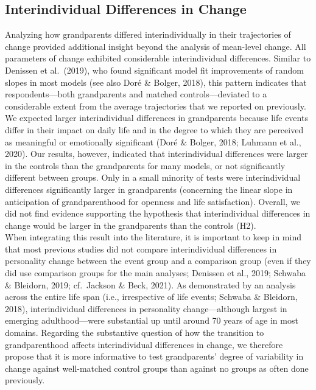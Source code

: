 \documentclass[
  english,
  man,floatsintext]{apa7}
\begin{document}
\hypertarget{interindividual-differences-in-change-1}{%
\subsection{Interindividual Differences in Change}\label{interindividual-differences-in-change-1}}

Analyzing how grandparents differed interindividually in their trajectories of change provided additional insight beyond the analysis of mean-level change. All parameters of change exhibited considerable interindividual differences. Similar to Denissen et al.~(2019), who found significant model fit improvements of random slopes in most models (see also Doré \& Bolger, 2018), this pattern indicates that respondents---both grandparents and matched controls---deviated to a considerable extent from the average trajectories that we reported on previously.\\
We expected larger interindividual differences in grandparents because life events differ in their impact on daily life and in the degree to which they are perceived as meaningful or emotionally significant (Doré \& Bolger, 2018; Luhmann et al., 2020). Our results, however, indicated that interindividual differences were larger in the controls than the grandparents for many models, or not significantly different between groups. Only in a small minority of tests were interindividual differences significantly larger in grandparents (concerning the linear slope in anticipation of grandparenthood for openness and life satisfaction). Overall, we did not find evidence supporting the hypothesis that interindividual differences in change would be larger in the grandparents than the controls (H2).\\
When integrating this result into the literature, it is important to keep in mind that most previous studies did not compare interindividual differences in personality change between the event group and a comparison group (even if they did use comparison groups for the main analyses; Denissen et al., 2019; Schwaba \& Bleidorn, 2019; cf.~Jackson \& Beck, 2021). As demonstrated by an analysis across the entire life span (i.e., irrespective of life events; Schwaba \& Bleidorn, 2018), interindividual differences in personality change---although largest in emerging adulthood---were substantial up until around 70 years of age in most domains. Regarding the substantive question of how the transition to grandparenthood affects interindividual differences in change, we therefore propose that it is more informative to test grandparents' degree of variability in change against well-matched control groups than against no groups as often done previously.\\
\end{document}
